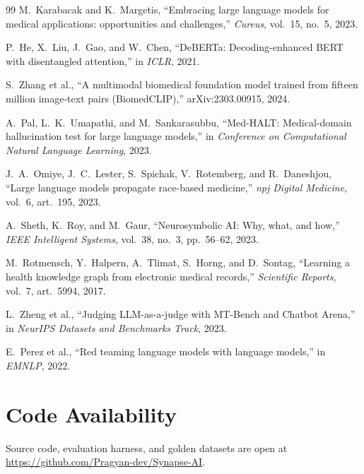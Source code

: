 \documentclass[twocolumn,10pt,main=USenglish]{asmeconf}
\begin{document}
\begin{thebibliography}{99}
M.~Karabacak and K.~Margetis, ``Embracing large language models for
medical applications: opportunities and challenges,''
\emph{Cureus}, vol.~15, no.~5, 2023.

P.~He, X.~Liu, J.~Gao, and W.~Chen, ``DeBERTa: Decoding-enhanced
BERT with disentangled attention,'' in \emph{ICLR}, 2021.

S.~Zhang et al., ``A multimodal biomedical foundation model trained
from fifteen million image-text pairs (BiomedCLIP),'' arXiv:2303.00915, 2024.

A.~Pal, L.~K.~Umapathi, and M.~Sankarasubbu, ``Med-HALT:
Medical-domain hallucination test for large language models,'' in
\emph{Conference on Computational Natural Language Learning},
2023.

J.~A.~Omiye, J.~C.~Lester, S.~Spichak, V.~Rotemberg, and R.~Daneshjou,
``Large language models propagate race-based medicine,''
\emph{npj Digital Medicine}, vol.~6, art.~195, 2023.

A.~Sheth, K.~Roy, and M.~Gaur, ``Neurosymbolic AI: Why, what, and
how,'' \emph{IEEE Intelligent Systems}, vol.~38, no.~3,
pp.~56--62, 2023.

M.~Rotmensch, Y.~Halpern, A.~Tlimat, S.~Horng, and D.~Sontag,
``Learning a health knowledge graph from electronic medical
records,'' \emph{Scientific Reports}, vol.~7, art.~5994, 2017.

L.~Zheng et al., ``Judging LLM-as-a-judge with MT-Bench and Chatbot
Arena,'' in \emph{NeurIPS Datasets and Benchmarks Track}, 2023.

E.~Perez et al., ``Red teaming language models with language
models,'' in \emph{EMNLP}, 2022.

\end{thebibliography}

\section*{Code Availability}
Source code, evaluation harness, and golden datasets are open at
\url{https://github.com/Pragyan-dev/Synapse-AI}.
\end{document}
